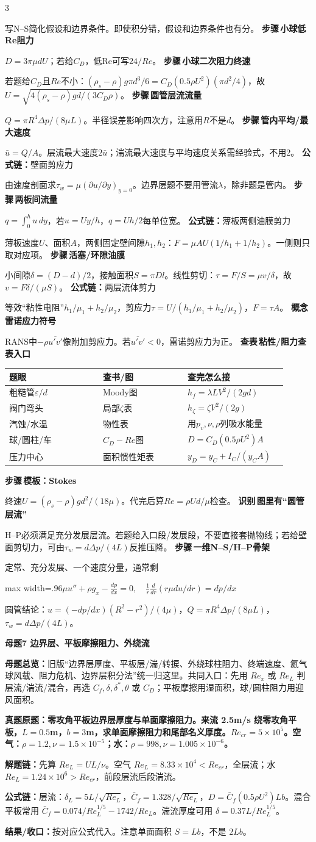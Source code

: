 \documentclass[a4paper]{article}
\newcommand{\mt}[1]{\vspace{0.12pt}\colorbox{M}{\parbox{\dimexpr\linewidth-2\fboxsep}{\color{white}\bfseries #1}}\par}
\newcommand{\qt}[1]{\vspace{0.04pt}\colorbox{Q}{\parbox{\dimexpr\linewidth-2\fboxsep}{\color{white}\bfseries #1}}\par}
\newcommand{\ans}[1]{\colorbox{G}{\parbox{\dimexpr\linewidth-2\fboxsep}{#1}}\par}
\newcommand{\chain}[1]{{\color{A}\bfseries 解题链：}#1\par}
\newcommand{\res}[1]{{\color{E}\bfseries 结果/收口：}#1\par}
\newcommand{\form}[1]{{\color{M}\bfseries 公式链：}#1\par}
\newcommand{\fmlb}[1]{\ans{\begin{adjustbox}{max width=.96\linewidth}$\displaystyle #1$\end{adjustbox}}}
\newcommand{\labtag}[3]{{\bfseries\color{#1}\colorbox{#1}{\color{white}\fontsize{2.18}{2.28}\selectfont #2}\,#3}\par}
\newcommand{\iden}[1]{\labtag{C}{识别}{#1}}
\newcommand{\step}[1]{\labtag{S}{步骤}{#1}}
\newcommand{\lookup}[1]{\labtag{C}{查表}{#1}}
\newcommand{\concept}[1]{\labtag{V}{概念}{#1}}
\newcommand{\mview}[1]{\ans{\textbf{母题总览：}#1}}
\newcommand{\idq}[1]{\iden{#1}}
\newcommand{\stepq}[1]{\step{#1}}
\newcommand{\formq}[1]{\form{#1}}
\newcommand{\lookq}[1]{\lookup{#1}}
\newcommand{\conceptq}[1]{\concept{#1}}
\newenvironment{vfourWrap}{\par\begingroup\fontsize{2.56}{2.70}\selectfont\setlength{\fboxsep}{0.38pt}}{\par\endgroup}
\begin{document}
\begin{multicols}{3}
\begin{vfourWrap}
写N--S简化假设和边界条件。即使积分错，假设和边界条件也有分。
\stepq{小球低Re阻力}
$D=3\pi\mu dU$；若给$C_D$，低Re可写$24/Re$。
\stepq{小球二次阻力终速}
若题给$C_D$且$Re$不小：$(\rho_s-\rho)g\pi d^3/6=C_D(0.5\rho U^2)(\pi d^2/4)$，故$U=\sqrt{4(\rho_s-\rho)gd/(3C_D\rho)}$。
\stepq{圆管层流流量}
$Q=\pi R^4\Delta p/(8\mu L)$。半径误差影响四次方，注意用$R$不是$d$。
\stepq{管内平均/最大速度}
$\bar u=Q/A$。层流最大速度$2\bar u$；湍流最大速度与平均速度关系需经验式，不用2。
\formq{壁面剪应力}
由速度剖面求$\tau_w=\mu(\partial u/\partial y)_{y=0}$。边界层题不要用管流$\lambda$，除非题是管内。
\stepq{两板间流量}
$q=\int_0^hu\,dy$，若$u=Uy/h$，$q=Uh/2$每单位宽。
\formq{薄板两侧油膜剪力}
薄板速度$U$、面积$A$，两侧固定壁间隙$h_1,h_2$：$F=\mu AU(1/h_1+1/h_2)$。一侧则只取对应项。
\stepq{活塞/环隙油膜}
小间隙$\delta=(D-d)/2$，接触面积$S=\pi Dl$。线性剪切：$\tau=F/S=\mu v/\delta$，故$v=F\delta/(\mu S)$。
\formq{两层流体剪力}
等效“粘性电阻”$h_1/\mu_1+h_2/\mu_2$，剪应力$\tau=U/(h_1/\mu_1+h_2/\mu_2)$，$F=\tau A$。
\conceptq{雷诺应力符号}
RANS中$-\rho\overline{u'v'}$像附加剪应力。若$\overline{u'v'}<0$，雷诺剪应力为正。
\lookq{粘性/阻力查表入口}
\begin{tabular}{|p{0.31\linewidth}|p{0.28\linewidth}|p{0.33\linewidth}|}\hline
题眼 & 查书/图 & 查完怎么接\\\hline
粗糙管$\varepsilon/d$ & Moody图 & $h_f=\lambda L V^2/(2gd)$\\\hline
阀门弯头 & 局部$\zeta$表 & $h_\zeta=\zeta V^2/(2g)$\\\hline
汽蚀/水温 & 物性表 & 用$p_v,\nu,\rho$列吸水能量\\\hline
球/圆柱/车 & $C_D-Re$图 & $D=C_D(0.5\rho U^2)A$\\\hline
压力中心 & 面积惯性矩表 & $y_D=y_C+I_C/(y_CA)$\\\hline
\end{tabular}
\stepq{模板：Stokes}
终速$U=(\rho_s-\rho)gd^2/(18\mu)$。代完后算$Re=\rho Ud/\mu$检查。
\idq{图里有“圆管层流”}
H--P必须满足充分发展层流。若题给入口段/发展段，不要直接套抛物线；若给壁面剪切力，可由$\tau_w=d\Delta p/(4L)$反推压降。
\stepq{一维N--S/H--P骨架}
定常、充分发展、一个速度分量，通常剩
\fmlb{\mu u''+\rho g_x-\frac{dp}{dx}=0,\quad \frac1r\frac d{dr}(r\mu du/dr)=dp/dx}
圆管结论：$u=(-dp/dx)(R^2-r^2)/(4\mu)$，$Q=\pi R^4\Delta p/(8\mu L)$，$\tau_w=d\Delta p/(4L)$。
\end{vfourWrap}
\mt{母题7 边界层、平板摩擦阻力、外绕流}
\mview{旧版“边界层厚度、平板层/湍/转捩、外绕球柱阻力、终端速度、氦气球风载、阻力危机、边界层积分法”统一归这里。共同入口：先用 $Re_x$ 或 $Re_L$ 判层流/湍流/混合，再选 $C_f,\delta,\delta^*,\theta$ 或 $C_D$；平板摩擦用湿面积，球/圆柱阻力用迎风面积。}
\qt{真题原题：零攻角平板边界层厚度与单面摩擦阻力。来流 2.5m/s 绕零攻角平板，$L=0.5$m，$b=3$m，求单面摩擦阻力和尾部名义厚度。$Re_{cr}=5\times10^5$。空气：$\rho=1.2,\nu=1.5\times10^{-5}$；水：$\rho=998,\nu=1.005\times10^{-6}$。}
\chain{先算 $Re_L=UL/\nu$。空气 $Re_L=8.33\times10^4<Re_{cr}$，全层流；水 $Re_L=1.24\times10^6>Re_{cr}$，前段层流后段湍流。}
\form{层流：$\delta_L=5L/\sqrt{Re_L}$，$\bar C_f=1.328/\sqrt{Re_L}$，$D=\bar C_f(0.5\rho U^2)Lb$。混合平板常用 $\bar C_f=0.074/Re_L^{1/5}-1742/Re_L$。湍流厚度可用 $\delta=0.37L/Re_L^{1/5}$。}
\res{按对应公式代入。注意单面面积 $S=Lb$，不是 $2Lb$。}


\end{multicols}
\end{document}
